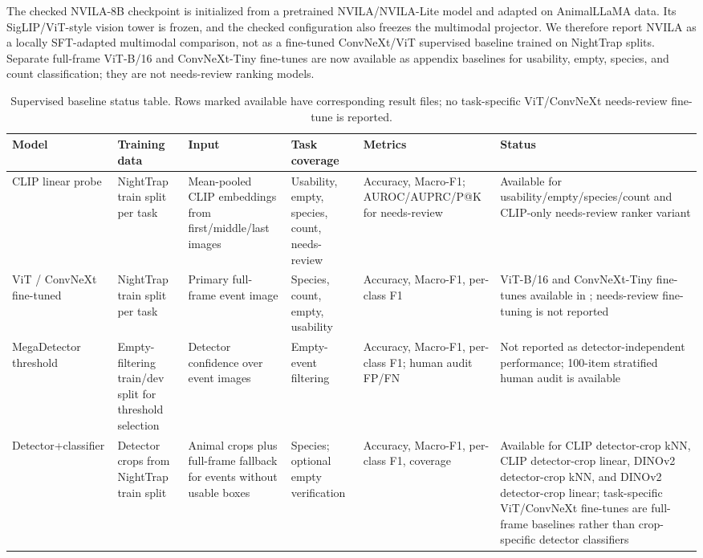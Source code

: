 \documentclass{article}
\begin{document}
The checked NVILA-8B checkpoint is initialized from a pretrained NVILA/NVILA-Lite model and adapted on AnimalLLaMA data. Its SigLIP/ViT-style vision tower is frozen, and the checked configuration also freezes the multimodal projector. We therefore report NVILA as a locally SFT-adapted multimodal comparison, not as a fine-tuned ConvNeXt/ViT supervised baseline trained on NightTrap splits. Separate full-frame ViT-B/16 and ConvNeXt-Tiny fine-tunes are now available as appendix baselines for usability, empty, species, and count classification; they are not needs-review ranking models.

\begin{table}[h]
\centering
\caption{Supervised baseline status table. Rows marked available have corresponding result files; no task-specific ViT/ConvNeXt needs-review fine-tune is reported.}
\label{tab:supervised_baseline_status}
\scriptsize
\setlength{\tabcolsep}{3pt}
\begin{tabularx}{\textwidth}{YYYYYY}
\toprule
Model & Training data & Input & Task coverage & Metrics & Status \\
\midrule
CLIP linear probe & NightTrap train split per task & Mean-pooled CLIP embeddings from first/middle/last images & Usability, empty, species, count, needs-review & Accuracy, Macro-F1; AUROC/AUPRC/P@K for needs-review & Available for usability/empty/species/count and CLIP-only needs-review ranker variant \\
ViT / ConvNeXt fine-tuned & NightTrap train split per task & Primary full-frame event image & Species, count, empty, usability & Accuracy, Macro-F1, per-class F1 & ViT-B/16 and ConvNeXt-Tiny fine-tunes available in ; needs-review fine-tuning is not reported \\
MegaDetector threshold & Empty-filtering train/dev split for threshold selection & Detector confidence over event images & Empty-event filtering & Accuracy, Macro-F1, per-class F1; human audit FP/FN & Not reported as detector-independent performance; 100-item stratified human audit is available \\
Detector+classifier & Detector crops from NightTrap train split & Animal crops plus full-frame fallback for events without usable boxes & Species; optional empty verification & Accuracy, Macro-F1, per-class F1, coverage & Available for CLIP detector-crop kNN, CLIP detector-crop linear, DINOv2 detector-crop kNN, and DINOv2 detector-crop linear; task-specific ViT/ConvNeXt fine-tunes are full-frame baselines rather than crop-specific detector classifiers \\

\end{tabularx}
\end{table}
\end{document}
